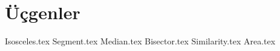 \section{Üçgenler}
{Isosceles.tex}
{Segment.tex}
{Median.tex}
{Bisector.tex}
{Similarity.tex}
{Area.tex}